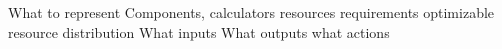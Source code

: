 What to represent
	Components, calculators
	resources
		requirements
		optimizable
	resource distribution
What inputs
What outputs
what actions




